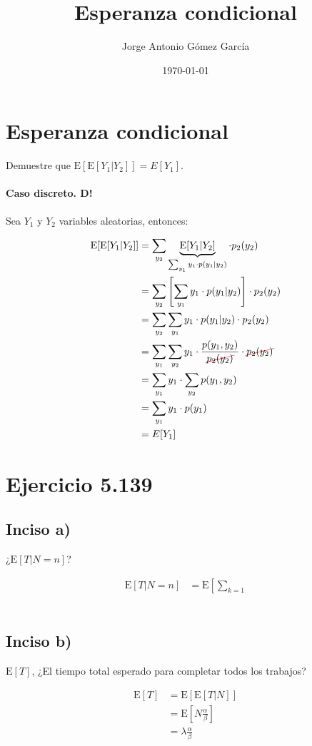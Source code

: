 \documentclass[8pt]{article}
\title{Esperanza condicional}
\author{Jorge Antonio Gómez García}
\date{\today}
\newcommand{\Cancel}[2][black]{{\color{#1}\cancel{\color{black}#2}}} %
\begin{document}
\maketitle

\section{Esperanza condicional}

Demuestre que $\text{E}[\text{E}[Y_1|Y_2]] = E[Y_1]$.

\paragraph{Caso discreto. D!} Sea $Y_1$ y $Y_2$ variables aleatorias, entonces:

\begin{align*}
    \text{E}[\text{E}[Y_1|Y_2]] &= \sum_{y_2} \underbrace{\text{E}[Y_1|Y_2]}_{\sum_{y_1} y_1 \cdot p(y_1|y_2)} \cdot p_2(y_2) \\
    &= \sum_{y_2} \left[ \sum_{y_1} y_1 \cdot p(y_1|y_2) \right] \cdot p_2(y_2) \\
    &= \sum_{y_2} \sum_{y_1} y_1 \cdot p(y_1|y_2) \cdot p_2(y_2) \\
    &= \sum_{y_1} \sum_{y_2} y_1 \cdot \frac{p(y_1,y_2)}{\Cancel[red]{p_2(y_2)}} \cdot \Cancel[red]{p_2(y_2)} \\
    &= \sum_{y_1} y_1 \cdot \sum_{y_2} p(y_1,y_2) \\
    &= \sum_{y_1} y_1 \cdot p(y_1) \\
    &= E[Y_1]
\end{align*}

\section{Ejercicio 5.139}

\subsection{Inciso a)} ¿$\text{E}[T|N=n]$?

\begin{align*}
    \text{E}[T|N=n] &= \text{E}\left[\sum_{k=1}
\end{align*}

\begin{align*}

\end{align*}

\subsection{Inciso b)} $\text{E}[T]$, ¿El tiempo total esperado para completar todos los trabajos?

\begin{align*}
    \text{E}[T] &= \text{E}[\text{E}[T|N]] \\
    &= \text{E}[N\frac{\alpha}{\beta}] \\
    &= \lambda \frac{\alpha}{\beta} \\
\end{align*}
\end{document}
